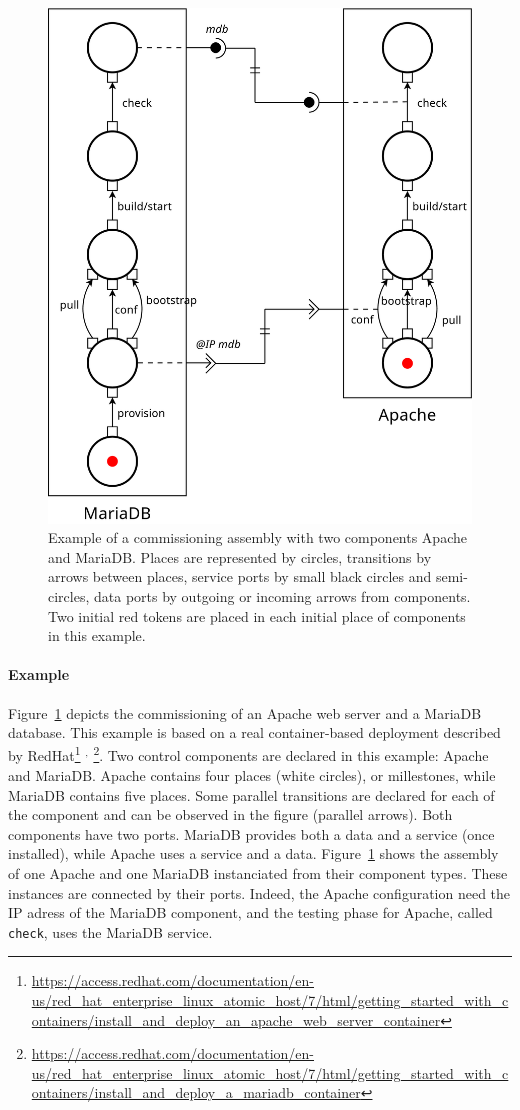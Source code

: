 \begin{figure}[tbp]
  \begin{center}
    \includegraphics[width=0.7\linewidth]{./images/apachebdd.pdf}
  \end{center}
  \caption{Example of a commissioning assembly with two components
    Apache and MariaDB. Places are represented by circles, transitions
    by arrows between places, service ports by small black circles and
    semi-circles, data ports by outgoing or incoming arrows from
    components. Two initial red tokens are placed in each initial
    place of components in this example.}
  \label{fig:example}
\end{figure}

\paragraph{Example}{ Figure~\ref{fig:example} depicts the \mad
  commissioning of an Apache web server and a MariaDB database. This
  example is based on a real container-based deployment described by
  RedHat\footnote{\url{https://access.redhat.com/documentation/en-us/red_hat_enterprise_linux_atomic_host/7/html/getting_started_with_containers/install_and_deploy_an_apache_web_server_container}}%
  $^,$%
  \footnote{\url{https://access.redhat.com/documentation/en-us/red_hat_enterprise_linux_atomic_host/7/html/getting_started_with_containers/install_and_deploy_a_mariadb_container}}. Two
  \mad control components are declared in this example: Apache and
  MariaDB. Apache contains four places (white circles), or
  millestones, while MariaDB contains five places. Some parallel
  transitions are declared for each of the component and can be
  observed in the figure (parallel arrows). Both components have two
  ports. MariaDB provides both a data and a service (once installed),
  while Apache uses a service and a data. Figure~\ref{fig:example}
  shows the assembly of one Apache and one MariaDB instanciated from
  their component types. These instances are connected by their
  ports. Indeed, the Apache configuration need the IP adress of the
  MariaDB component, and the testing phase for Apache, called
  \texttt{check}, uses the MariaDB service.}

